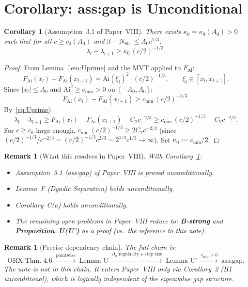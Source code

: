 \documentclass[12pt]{amsart}
\newtheorem{corollary}[theorem]{Corollary}
\newtheorem{remark}[theorem]{Remark}
\newcommand{\FAi}{F_{\mathrm{Ai}}}
\newcommand{\NSh}{N_{\mathrm{Sh}}}
\begin{document}
\section{Corollary: ass:gap is Unconditional}
\label{sec:corollary}

\begin{corollary}[Assumption~3.1 of Paper~VIII]
\label{ass:gap}
There exists $\kappa_0 = \kappa_0(A_0) > 0$ such that
for all $c \ge c_0(A_0)$ and $|l - \NSh| \le A_0 c^{1/3}$:
\[
  \lambda_l - \lambda_{l+1} \ge \kappa_0\,(c/2)^{-1/3}.
\]
\end{corollary}

\begin{proof}
From Lemma~\ref{lem:Uprime} and the MVT applied to $\FAi$:
\[
  \FAi(x_l) - \FAi(x_{l+1})
  = \mathrm{Ai}(\xi_l)^2 \cdot (c/2)^{-1/3},
  \qquad \xi_l \in [x_l, x_{l+1}].
\]
Since $|x_l| \le A_0$ and $\mathrm{Ai}^2 \ge c_{\min} > 0$
on $[-A_0, A_0]$:
\[
  \FAi(x_l) - \FAi(x_{l+1}) \ge c_{\min}\,(c/2)^{-1/3}.
\]
By~\eqref{eq:Uprime}:
\[
  \lambda_l - \lambda_{l+1}
  \ge \FAi(x_l) - \FAi(x_{l+1}) - C_2 c^{-2/3}
  \ge c_{\min}\,(c/2)^{-1/3} - C_2 c^{-2/3}.
\]
For $c \ge c_0$ large enough,
$c_{\min}\,(c/2)^{-1/3} \ge 2 C_2 c^{-2/3}$
(since $(c/2)^{-1/3}/c^{-2/3} = (c/2)^{-1/3} c^{2/3}
= 2^{1/3} c^{1/3} \to \infty$).
Set $\kappa_0 := c_{\min}/2$.
\end{proof}

\begin{remark}[What this resolves in Paper~VIII]
With Corollary~\ref{ass:gap}:
\begin{itemize}
  \item Assumption~3.1 (ass:gap) of Paper~VIII \cite{paperVIII}
        is proved unconditionally.
  \item Lemma~F (Dyadic Separation) holds unconditionally.
  \item Corollary~C(a) holds unconditionally.
  \item The remaining open problems in Paper~VIII reduce to:
        \textbf{B-strong} and \textbf{Proposition~U(U')}
        as a \emph{proof} (vs.\ the reference to this note).
\end{itemize}
\end{remark}

\begin{remark}[Precise dependency chain]
The full chain is:
\[
  \text{ORX Thm.~4.6}
  \;\xrightarrow{\text{pointwise}}\;
  \text{Lemma~U}
  \;\xrightarrow{\partial_\mu \text{ regularity}+\text{step size}}
  \;\text{Lemma~U'}
  \;\xrightarrow{c_{\min}>0}\;
  \text{ass:gap}.
\]
The \cite{PhaseNondeg} note is \emph{not} in this chain.
It enters Paper~VIII only via Corollary~2
(H1 unconditional), which is logically independent
of the eigenvalue gap structure.
\end{remark}
\end{document}
